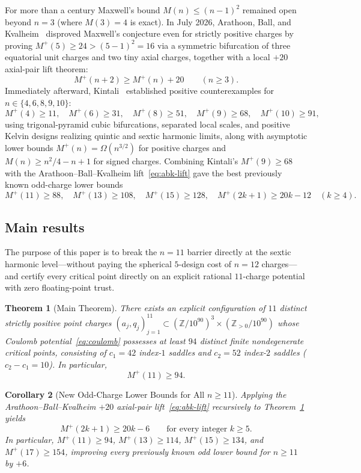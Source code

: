 \documentclass[11pt,a4paper]{amsart}
\newtheorem{theorem}{Theorem}[section]
\newtheorem{corollary}[theorem]{Corollary}
\theoremstyle{definition}
\newcommand{\Z}{\mathbb{Z}}
\begin{document}
For more than a century Maxwell's bound $M(n) \le (n-1)^2$ remained open beyond
$n = 3$ (where $M(3) = 4$ is exact). In July 2026, Arathoon, Ball, and
Kvalheim~\cite{ABK2026} disproved Maxwell's conjecture even for strictly
positive charges by proving $M^+(5) \ge 24 > (5-1)^2 = 16$ via a symmetric
bifurcation of three equatorial unit charges and two tiny axial charges,
together with a local $+20$ axial-pair lift theorem:
\begin{equation}\label{eq:abk-lift}
  M^+(n+2) \ge M^+(n) + 20 \qquad (n \ge 3).
\end{equation}
Immediately afterward, Kintali~\cite{Kintali2026pos,Kintali2026quad,Kintali2026sup}
established positive counterexamples for $n \in \{4,6,8,9,10\}$:
\[
  M^+(4) \ge 11,\quad M^+(6) \ge 31,\quad M^+(8) \ge 51,\quad
  M^+(9) \ge 68,\quad M^+(10) \ge 91,
\]
using trigonal-pyramid cubic bifurcations, separated local scales, and positive
Kelvin designs realizing quintic and sextic harmonic limits, along with
asymptotic lower bounds $M^+(n) = \Omega(n^{3/2})$ for positive charges and
$M(n) \ge n^2/4 - n + 1$ for signed charges. Combining Kintali's $M^+(9) \ge 68$
with the Arathoon--Ball--Kvalheim lift~\eqref{eq:abk-lift} gave the best
previously known odd-charge lower bounds
\[
  M^+(11) \ge 88, \quad M^+(13) \ge 108, \quad M^+(15) \ge 128, \quad
  M^+(2k+1) \ge 20k - 12 \quad (k \ge 4).
\]

\subsection*{Main results}
The purpose of this paper is to break the $n = 11$ barrier directly at the
sextic harmonic level---without paying the spherical $5$-design cost of $n = 12$
charges---and certify every critical point directly on an explicit rational
$11$-charge potential with zero floating-point trust.

\begin{theorem}[Main Theorem]\label{thm:main}
There exists an explicit configuration of $11$ distinct strictly positive point
charges $(a_j, q_j)_{j=1}^{11} \subset (\Z / 10^{90})^3 \times (\Z_{>0} / 10^{90})$
whose Coulomb potential~\eqref{eq:coulomb} possesses at least $94$ distinct
finite nondegenerate critical points, consisting of $c_1 = 42$ index-$1$ saddles
and $c_2 = 52$ index-$2$ saddles ($c_2 - c_1 = 10$). In particular,
\[
  M^+(11) \ge 94.
\]
\end{theorem}

\begin{corollary}[New Odd-Charge Lower Bounds for All $n \ge 11$]\label{cor:odd}
Applying the Arathoon--Ball--Kvalheim $+20$ axial-pair lift~\eqref{eq:abk-lift}
recursively to Theorem~\ref{thm:main} yields
\[
  M^+(2k+1) \ge 20k - 6 \qquad \text{for every integer } k \ge 5.
\]
In particular, $M^+(11) \ge 94$, $M^+(13) \ge 114$, $M^+(15) \ge 134$, and
$M^+(17) \ge 154$, improving every previously known odd lower bound for
$n \ge 11$ by $+6$.
\end{corollary}
\end{document}
